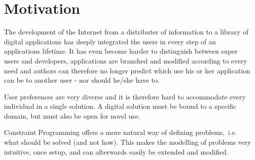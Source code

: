%
%
%
%
%
%
%

\section{Motivation}
The development of the Internet from a distributer of information to a library of digital applications has deeply integrated the users in every step of an applications lifetime. It has even become harder to distinguish between super users and developers, applications are branched and modified according to every need and authors can therefore no longer predict which use his or her application can be to another user - nor should he/she have to.

User preferences are very diverse and it is therefore hard to accommodate every individual in a single solution. A digital solution must be bound to a specific domain, but must also be open for novel use.

Constraint Programming offers a more natural way of defining problems,~i.e. what should be solved (and not how). This makes the modelling of problems very intuitive, once setup, and can afterwards easily be extended and modified.



